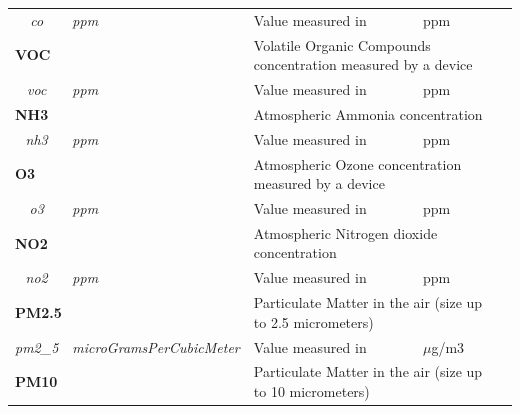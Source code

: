 \begin{landscape}
\begin{longtable}{cllll}
   \textit{co}                           & \textit{ppm}                       & Value measured in                                      & ppm                            &  \\ \cline{1-4}
   \multicolumn{2}{l}{\textbf{VOC}}                                           & \multicolumn{2}{l}{Volatile Organic Compounds concentration measured by a device}       &  \\
   \textit{voc}                          & \textit{ppm}                       & Value measured in                                      & ppm                            &  \\ \cline{1-4}
   \multicolumn{2}{l}{\textbf{NH3}}                                           & \multicolumn{2}{l}{Atmospheric Ammonia concentration}                                   &  \\
   \textit{nh3}                          & \textit{ppm}                       & Value measured in                                      & ppm                            &  \\ \cline{1-4}
   \multicolumn{2}{l}{\textbf{O3}}                                            & \multicolumn{2}{l}{Atmospheric Ozone concentration measured by a device}                &  \\
   \textit{o3}                           & \textit{ppm}                       & Value measured in                                      & ppm                            &  \\ \cline{1-4}
   \multicolumn{2}{l}{\textbf{NO2}}                                           & \multicolumn{2}{l}{Atmospheric Nitrogen dioxide concentration}                          &  \\
   \textit{no2}                          & \textit{ppm}                       & Value measured in                                      & ppm                            &  \\ \cline{1-4}
   \multicolumn{2}{l}{\textbf{PM2.5}}                                         & \multicolumn{2}{l}{Particulate Matter in the air (size up to 2.5 micrometers)}          &  \\
   \textit{pm2\_5}                       & \textit{microGramsPerCubicMeter}   & Value measured in                                      & $\mu$g/m3                      &  \\ \cline{1-4}
   \multicolumn{2}{l}{\textbf{PM10}}                                          & \multicolumn{2}{l}{Particulate Matter in the air (size up to 10 micrometers)}           &  \\

\end{longtable}
\end{landscape}
